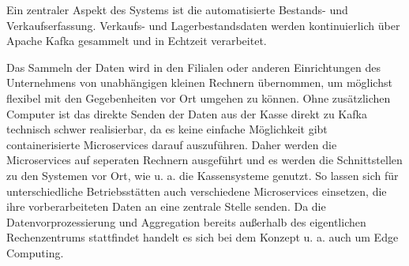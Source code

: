 \documentclass[%
pdftex,
oneside,			%
11pt,				%
parskip=half,		%
headheight = 12pt,	%
headsepline,		%
footsepline,		%
footheight = 16pt,	%
abstracton,		%
DIV=calc,		%
BCOR=8mm,		%
headinclude=false,	%
footinclude=false,	%
listof=totoc,		%
toc=bibliography,	%
]{scrreprt}	%
\begin{document}


    Ein zentraler Aspekt des Systems ist die automatisierte Bestands- und Verkaufserfassung.
    Verkaufs- und Lagerbestandsdaten werden kontinuierlich über Apache Kafka gesammelt und in Echtzeit verarbeitet.

    Das Sammeln der Daten wird in den Filialen oder anderen Einrichtungen des Unternehmens von unabhängigen kleinen Rechnern übernommen, um möglichst flexibel mit den Gegebenheiten vor Ort umgehen zu können.
    Ohne zusätzlichen Computer ist das direkte Senden der Daten aus der Kasse direkt zu Kafka technisch schwer realisierbar, da es keine einfache Möglichkeit gibt containerisierte Microservices darauf auszuführen.
    Daher werden die Microservices auf seperaten Rechnern ausgeführt und es werden die Schnittstellen zu den Systemen vor Ort, wie u. a. die Kassensysteme genutzt.
    So lassen sich für unterschiedliche Betriebsstätten auch verschiedene Microservices einsetzen, die ihre vorberarbeiteten Daten an eine zentrale Stelle senden.
    Da die Datenvorprozessierung und Aggregation bereits außerhalb des eigentlichen Rechenzentrums stattfindet handelt es sich bei dem Konzept u. a. auch um Edge Computing.
\end{document}
